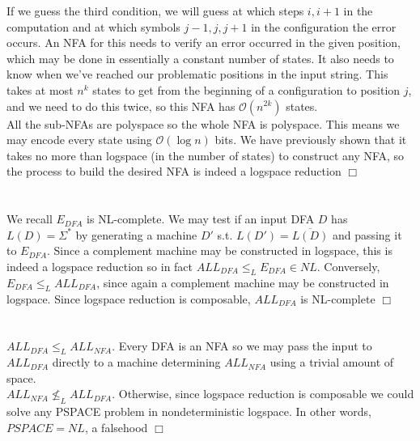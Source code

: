\documentclass{article}
\begin{document}
If we guess the third condition, we will guess at which steps $i, i+1$ in the computation and at which symbols $j-1, j, j+1$ in the configuration the error occurs. An NFA for this needs to verify an error occurred in the given position, which may be done in essentially a constant number of states. It also needs to know when we've reached our problematic positions in the input string. This takes at most $n^k$ states to get from the beginning of a configuration to position $j$, and we need to do this twice, so this NFA has $\mathcal{O}(n^{2k})$ states.\\
All the sub-NFAs are polyspace so the whole NFA is polyspace. This means we may encode every state using $\mathcal{O}(\log n)$ bits. We have previously shown that it takes no more than logspace (in the number of states) to construct any NFA, so the process to build the desired NFA is indeed a logspace reduction $\Box$

\section{}
We recall $E_{DFA}$ is NL-complete. We may test if an input DFA $D$ has $L(D) = \Sigma^*$ by generating a machine $D'$ s.t. $L(D') = \overline{L(D)}$ and passing it to $E_{DFA}$. Since a complement machine may be constructed in logspace, this is indeed a logspace reduction so in fact $ALL_{DFA} \leqslant_L E_{DFA} \in NL$. Conversely, $E_{DFA} \leqslant_L ALL_{DFA}$, since again a complement machine may be constructed in logspace. Since logspace reduction is composable, $ALL_{DFA}$ is NL-complete $\Box$

\section{}
$ALL_{DFA} \leqslant_L ALL_{NFA}$. Every DFA is an NFA so we may pass the input to $ALL_{DFA}$ directly to a machine determining $ALL_{NFA}$ using a trivial amount of space.\\
$ALL_{NFA} \nleqslant_L ALL_{DFA}$. Otherwise, since logspace reduction is composable we could solve any PSPACE problem in nondeterministic logspace. In other words, $PSPACE = NL$, a falsehood $\Box$
\end{document}
